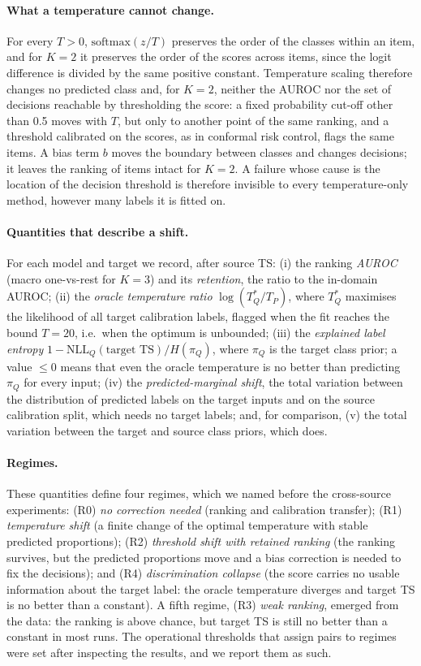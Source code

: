 \paragraph{What a temperature cannot change.}
For every $T > 0$, $\mathrm{softmax}(z/T)$ preserves the order of the classes within an item, and for $K = 2$ it
preserves the order of the scores across items, since the logit difference is divided by the same positive constant.
Temperature scaling therefore changes no predicted class and, for $K = 2$, neither the AUROC nor the set of decisions
reachable by thresholding the score: a fixed probability cut-off other than 0.5 moves with $T$, but only to another
point of the same ranking, and a threshold calibrated on the scores, as in conformal risk control, flags the same
items. A bias term $b$ moves the boundary between classes and changes
decisions; it leaves the ranking of items intact for $K = 2$. A failure whose cause is the location of the decision
threshold is therefore invisible to every temperature-only method, however many labels it is fitted on.

\paragraph{Quantities that describe a shift.}
For each model and target we record, after source TS:
(i) the ranking \emph{AUROC} (macro one-vs-rest for $K = 3$) and its \emph{retention}, the ratio to the in-domain AUROC;
(ii) the \emph{oracle temperature ratio} $\log(T^{*}_{Q} / T_{P})$, where $T^{*}_{Q}$ maximises the likelihood of all
target calibration labels, flagged when the fit reaches the bound $T = 20$, i.e.\ when the optimum is unbounded;
(iii) the \emph{explained label entropy} $1 - \mathrm{NLL}_{Q}(\text{target TS}) / H(\pi_Q)$, where $\pi_Q$ is the
target class prior; a value $\le 0$ means that even the oracle temperature is no better than predicting $\pi_Q$ for
every input;
(iv) the \emph{predicted-marginal shift}, the total variation between the distribution of predicted labels on the
target inputs and on the source calibration split, which needs no target labels; and, for comparison,
(v) the total variation between the target and source class priors, which does.

\paragraph{Regimes.}
These quantities define four regimes, which we named before the cross-source experiments:
(R0) \emph{no correction needed} (ranking and calibration transfer);
(R1) \emph{temperature shift} (a finite change of the optimal temperature with stable predicted proportions);
(R2) \emph{threshold shift with retained ranking} (the ranking survives, but the predicted proportions move and a bias
correction is needed to fix the decisions); and
(R4) \emph{discrimination collapse} (the score carries no usable information about the target label: the oracle
temperature diverges and target TS is no better than a constant). A fifth regime, (R3) \emph{weak ranking}, emerged
from the data: the ranking is above chance, but target TS is still no better than a constant in most runs. The operational thresholds that
assign pairs to regimes were set after inspecting the results, and we report them as such.
